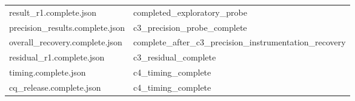 \begin{longtable}{>{\raggedright\arraybackslash}p{.49\linewidth}>{\raggedright\arraybackslash}p{.44\linewidth}}
result\_\allowbreak{}r1.complete.json & %
completed\_\allowbreak{}exploratory\_\allowbreak{}probe \\ %

precision\_\allowbreak{}results.complete.json & %
c3\_\allowbreak{}precision\_\allowbreak{}probe\_\allowbreak{}complete \\ %

overall\_\allowbreak{}recovery.complete.json & %
complete\_\allowbreak{}after\_\allowbreak{}c3\_\allowbreak{}precision\_\allowbreak{}instrumentation\_\allowbreak{}recovery \\ %

residual\_\allowbreak{}r1.complete.json & %
c3\_\allowbreak{}residual\_\allowbreak{}complete \\ %

timing.complete.json & %
c4\_\allowbreak{}timing\_\allowbreak{}complete \\ %

cq\_\allowbreak{}release.complete.json & %
c4\_\allowbreak{}timing\_\allowbreak{}complete \\ %


\end{longtable}
